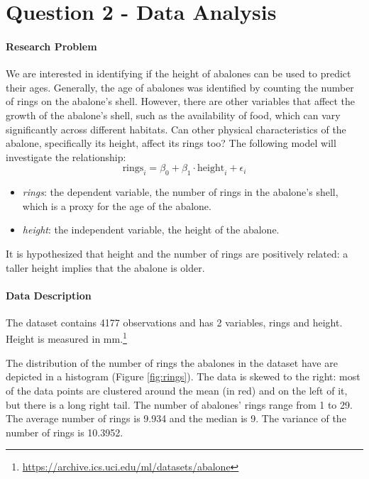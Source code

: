 \documentclass[11pt,letterpaper]{article}
\begin{document}
	\newpage
	
	\section*{Question 2 - Data Analysis}
	
	\paragraph*{Research Problem}
	We are interested in identifying if the height of abalones can be used to predict their ages. Generally, the age of abalones was identified by counting the number of rings on the abalone's shell. However, there are other variables that affect the growth of the abalone's shell, such as the availability of food, which can vary significantly across different habitats. Can other physical characteristics of the abalone, specifically its height, affect its rings too? The following model will investigate the relationship:
	\[\text{rings}_i = \beta_0 + \beta_1 \cdot \text{height}_i + \epsilon_i\]
	\begin{itemize}
		\item \textit{rings}: the dependent variable, the number of rings in the abalone's shell, which is a proxy for  the age of the abalone.
		\item \textit{height}: the independent variable, the height of the abalone.
	\end{itemize}

	It is hypothesized that height and the number of rings are positively related: a taller height implies that the abalone is older.
	
	\paragraph*{Data Description}
	The dataset contains 4177 observations and has 2 variables, rings and height. Height is measured in mm.\footnote{\url{https://archive.ics.uci.edu/ml/datasets/abalone}}
	
	The distribution of the number of rings the abalones in the dataset have are depicted in a histogram (Figure \ref{fig:rings}). The data is skewed to the right: most of the data points are clustered around the mean (in red) and on the left of it, but there is a long right tail. The number of abalones' rings range from 1 to 29. The average number of rings is 9.934 and the median is 9. The variance of the number of rings is 10.3952. 
\end{document}

